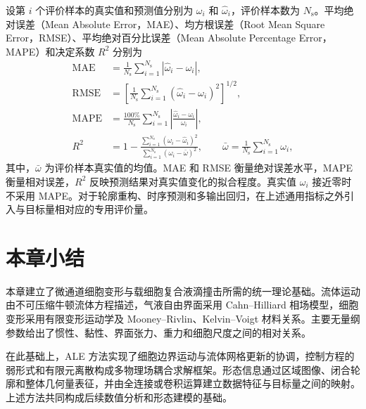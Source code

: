 设第 $i$ 个评价样本的真实值和预测值分别为 $\omega_i$ 和 $\widehat\omega_i$，评价样本数为 $N_{\mathrm s}$。平均绝对误差（Mean Absolute Error，MAE）、均方根误差（Root Mean Square Error，RMSE）、平均绝对百分比误差（Mean Absolute Percentage Error，MAPE）和决定系数 $R^2$ 分别为
\begin{align}
\mathrm{MAE}
&=
\frac{1}{N_{\mathrm s}}
\sum_{i=1}^{N_{\mathrm s}}
\left|\widehat\omega_i-\omega_i\right|,
\label{eq:ch2_mae}\\
\mathrm{RMSE}
&=
\left[
\frac{1}{N_{\mathrm s}}
\sum_{i=1}^{N_{\mathrm s}}
\left(\widehat\omega_i-\omega_i\right)^2
\right]^{1/2},
\label{eq:ch2_rmse}\\
\mathrm{MAPE}
&=
\frac{100\%}{N_{\mathrm s}}
\sum_{i=1}^{N_{\mathrm s}}
\left|
\frac{\widehat\omega_i-\omega_i}{\omega_i}
\right|,
\label{eq:ch2_mape}\\
R^2
&=
1-
\frac{
\sum_{i=1}^{N_{\mathrm s}}
\left(\omega_i-\widehat\omega_i\right)^2}
{
\sum_{i=1}^{N_{\mathrm s}}
\left(\omega_i-\bar\omega\right)^2},
\qquad
\bar\omega
=
\frac{1}{N_{\mathrm s}}
\sum_{i=1}^{N_{\mathrm s}}\omega_i,
\label{eq:ch2_r2}
\end{align}
其中，$\bar\omega$ 为评价样本真实值的均值。MAE 和 RMSE 衡量绝对误差水平，MAPE 衡量相对误差，$R^2$ 反映预测结果对真实值变化的拟合程度。真实值 $\omega_i$ 接近零时不采用 MAPE。对于轮廓重构、时序预测和多输出回归，在上述通用指标之外引入与目标量相对应的专用评价量。

\section{本章小结}
\label{sec:ch2_summary}

本章建立了微通道细胞变形与载细胞复合液滴撞击所需的统一理论基础。流体运动由不可压缩牛顿流体方程描述，气液自由界面采用 Cahn--Hilliard 相场模型，细胞变形采用有限变形运动学及 Mooney--Rivlin、Kelvin--Voigt 材料关系。主要无量纲参数给出了惯性、黏性、界面张力、重力和细胞尺度之间的相对关系。

在此基础上，ALE 方法实现了细胞边界运动与流体网格更新的协调，控制方程的弱形式和有限元离散构成多物理场耦合求解框架。形态信息通过区域图像、闭合轮廓和整体几何量表征，并由全连接或卷积运算建立数据特征与目标量之间的映射。上述方法共同构成后续数值分析和形态建模的基础。
